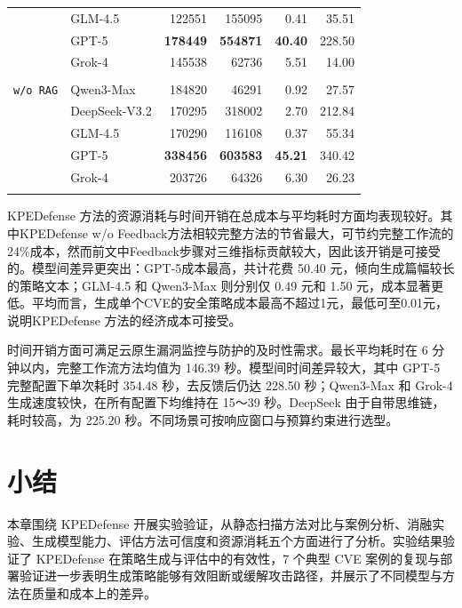 \begin{table}[htb!]
{\begin{tabular}{>{\raggedright\arraybackslash}p{2.8cm} >{\raggedright\arraybackslash}p{2.2cm} r r r r}
 & GLM-4.5 & 122551 & 155095 & 0.41 & 35.51 \\
 & GPT-5 & \textbf{178449} & \textbf{554871} & \textbf{40.40} & 228.50 \\
 & Grok-4 & 145538 & 62736 & 5.51 & 14.00 \\
\addlinespace[0.25em]\midrule
\multirow{5}{*}{\makecell[l]{\texttt{KPEDefense}\\\texttt{w/o RAG}}} & Qwen3-Max & 184820 & 46291 & 0.92 & 27.57 \\
 & \mbox{DeepSeek-V3.2} & 170295 & 318002 & 2.70 & 212.84 \\
 & GLM-4.5 & 170290 & 116108 & 0.37 & 55.34 \\
 & GPT-5 & \textbf{338456} & \textbf{603583} & \textbf{45.21} & 340.42 \\
 & Grok-4 & 203726 & 64326 & 6.30 & 26.23 \\
\addlinespace[0.25em]
\bottomrule
\end{tabular}%
}
\end{table}

KPEDefense 方法的资源消耗与时间开销在总成本与平均耗时方面均表现较好。其中KPEDefense w/o Feedback方法相较完整方法的节省最大，可节约完整工作流的 24\%成本，然而前文中Feedback步骤对三维指标贡献较大，因此该开销是可接受的。模型间差异更突出：GPT-5成本最高，共计花费 50.40 元，倾向生成篇幅较长的策略文本；GLM-4.5 和 Qwen3-Max 则分别仅 0.49 元和 1.50 元，成本显著更低。平均而言，生成单个CVE的安全策略成本最高不超过1元，最低可至0.01元，说明KPEDefense 方法的经济成本可接受。

时间开销方面可满足云原生漏洞监控与防护的及时性需求。最长平均耗时在 6 分钟以内，完整工作流方法均值为 146.39 秒。模型间时间差异较大，其中 GPT-5 完整配置下单次耗时 354.48 秒，去反馈后仍达 228.50 秒；Qwen3-Max 和 Grok-4 生成速度较快，在所有配置下均维持在 15～39 秒。DeepSeek 由于自带思维链，耗时较高，为 225.20 秒。不同场景可按响应窗口与预算约束进行选型。

\section{小结}
本章围绕 KPEDefense 开展实验验证，从静态扫描方法对比与案例分析、消融实验、生成模型能力、评估方法可信度和资源消耗五个方面进行了分析。实验结果验证了 KPEDefense 在策略生成与评估中的有效性，7 个典型 CVE 案例的复现与部署验证进一步表明生成策略能够有效阻断或缓解攻击路径，并展示了不同模型与方法在质量和成本上的差异。



